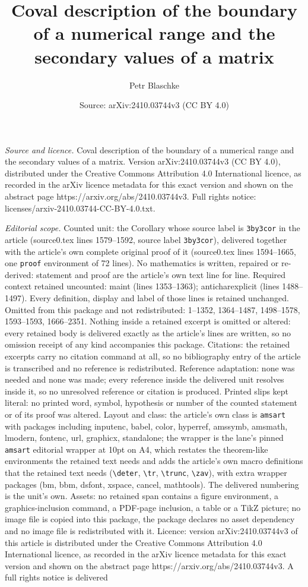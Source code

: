 \documentclass[10pt,a4paper]{amsart}
\title[Coval description of the boundary of a numerical range and t]{Coval description of the boundary of a numerical range and the secondary values of a matrix}
\author{Petr Blaschke}
\date{Source: arXiv:2410.03744v3 (CC BY 4.0)}
\begin{document}
\maketitle

\noindent\emph{Source and licence.} Coval description of the boundary of a numerical range and the secondary values of a matrix. Version arXiv:2410.03744v3 (CC BY 4.0), distributed under the Creative Commons Attribution 4.0 International licence, as recorded in the arXiv licence metadata for this exact version and shown on the abstract page https://arxiv.org/abs/2410.03744v3. Full rights notice: licenses/arxiv-2410.03744-CC-BY-4.0.txt.\par\smallskip

\noindent\textit{Editorial scope.} Counted unit: the Corollary whose source label is \texttt{3by3cor} in the article (source0.tex lines 1579--1592, source label \texttt{3by3cor}), delivered together with the article's own complete original proof of it (source0.tex lines 1594--1665, one \texttt{proof} environment of 72 lines). No mathematics is written, repaired or re-derived: statement and proof are the article's own text line for line. Required context retained uncounted: maint (lines 1353--1363); anticharexplicit (lines 1488--1497). Every definition, display and label of those lines is retained unchanged. Omitted from this package and not redistributed: 1--1352, 1364--1487, 1498--1578, 1593--1593, 1666--2351. Nothing inside a retained excerpt is omitted or altered: every retained body is delivered exactly as the article's lines are written, so no omission receipt of any kind accompanies this package. Citations: the retained excerpts carry no citation command at all, so no bibliography entry of the article is transcribed and no reference is redistributed. Reference adaptation: none was needed and none was made; every reference inside the delivered unit resolves inside it, so no unresolved reference or citation is produced. Printed slips kept literal: no printed word, symbol, hypothesis or number of the counted statement or of its proof was altered. Layout and class: the article's own class is \texttt{amsart} with packages including inputenc, babel, color, hyperref, amssymb, amsmath, lmodern, fontenc, url, graphicx, standalone; the wrapper is the lane's pinned \texttt{amsart} editorial wrapper at 10pt on A4, which restates the theorem-like environments the retained text needs and adds the article's own macro definitions that the retained text needs (\texttt{\textbackslash deter}, \texttt{\textbackslash tr}, \texttt{\textbackslash trunc}, \texttt{\textbackslash zav}), with extra wrapper packages (bm, bbm, dsfont, xspace, cancel, mathtools). The delivered numbering is the unit's own. Assets: no retained span contains a figure environment, a graphics-inclusion command, a PDF-page inclusion, a table or a TikZ picture; no image file is copied into this package, the package declares no asset dependency and no image file is redistributed with it. Licence: version arXiv:2410.03744v3 of this article is distributed under the Creative Commons Attribution 4.0 International licence, as recorded in the arXiv licence metadata for this exact version and shown on the abstract page https://arxiv.org/abs/2410.03744v3. A full rights notice is delivered 
\end{document}

